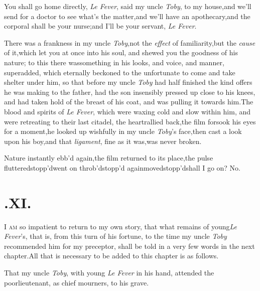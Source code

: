 \documentclass{article}
\begin{document}
\tsh You shall go home directly, \textit{Le Fever}, said
my uncle \textit{Toby}, to my house,\break\tsk and we’ll send for a
doctor to see what’s the matter,\tsk and we’ll have
an apothecary,\tsk and the corporal shall be your
nurse;\tsh and I’ll be your servant, \textit{Le
Fever}.

There was a frankness in my uncle \textit{Toby},\tsk not the
\textit{effect} of familiarity,\tsk but the \textit{cause} of
it,\tsk which let you at once into his soul, and shewed you the
goodness of his nature; to this there was\pb something in his looks,
and voice, and manner, superadded, which eternally beckoned to the
unfortunate to come and take shelter under him, so that before my
uncle \textit{Toby} had half finished the kind offers he was making
to the father, had the son insensibly pressed up close to his
knees, and had taken hold of the breast of his coat, and was
pulling it towards him.\tsh The blood and spirits of \textit{Le
Fever}, which were waxing cold and slow within him, and were
retreating to their last citadel, the heart\tsk rallied
back,\tsk the film forsook his eyes for a moment,\tsk he looked
up wishfully in my uncle \textit{Toby}’s face,\tsk then cast
a look upon his boy,\tsh and that \textit{ligament}, fine as
it was,\tsk was never broken.\tsh

Nature instantly ebb’d again,\tsk the film returned to
its place,\tsh the pulse\pb
fluttered\tsh stopp’d\tsh went on\tsh\break
\tsh throb’d\tsh stopp’d again\tsh moved\tsh stopp’d\tsh shall
I go on?\tsh\break
No.

\section{.\enspace XI.}

\lettrine{I}{ am} so impatient to return to my own
story, that what remains of young\break\textit{Le Fever}’s, that is,
from this turn of his fortune, to the time my uncle \textit{Toby}
recommended him for my preceptor, shall be told in a very few words
in the next chapter.\tsk All that is necessary to be added to
this chapter is as follows.\tsk 

That my uncle \textit{Toby}, with young \textit{Le Fever} in his
hand, attended the poor\break lieutenant, as chief mourners, to his\break
grave.
\end{document}
